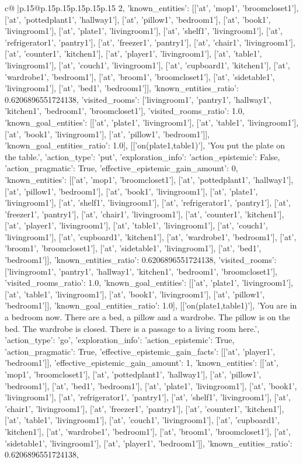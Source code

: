 \documentclass{article}
\begin{document}
{\begin{supertabular}{c@{$\;$}|p{.15\linewidth}@{}p{.15\linewidth}p{.15\linewidth}p{.15\linewidth}p{.15\linewidth}p{.15\linewidth}}
{{{2, 'known_entities': [['at', 'mop1', 'broomcloset1'], ['at', 'pottedplant1', 'hallway1'], ['at', 'pillow1', 'bedroom1'], ['at', 'book1', 'livingroom1'], ['at', 'plate1', 'livingroom1'], ['at', 'shelf1', 'livingroom1'], ['at', 'refrigerator1', 'pantry1'], ['at', 'freezer1', 'pantry1'], ['at', 'chair1', 'livingroom1'], ['at', 'counter1', 'kitchen1'], ['at', 'player1', 'livingroom1'], ['at', 'table1', 'livingroom1'], ['at', 'couch1', 'livingroom1'], ['at', 'cupboard1', 'kitchen1'], ['at', 'wardrobe1', 'bedroom1'], ['at', 'broom1', 'broomcloset1'], ['at', 'sidetable1', 'livingroom1'], ['at', 'bed1', 'bedroom1']], 'known_entities_ratio': 0.6206896551724138, 'visited_rooms': ['livingroom1', 'pantry1', 'hallway1', 'kitchen1', 'bedroom1', 'broomcloset1'], 'visited_rooms_ratio': 1.0, 'known_goal_entities': [['at', 'plate1', 'livingroom1'], ['at', 'table1', 'livingroom1'], ['at', 'book1', 'livingroom1'], ['at', 'pillow1', 'bedroom1']], 'known_goal_entities_ratio': 1.0}}], [['on(plate1,table1)'], 'You put the plate on the table.', {'action_type': 'put', 'exploration_info': {'action_epistemic': False, 'action_pragmatic': True, 'effective_epistemic_gain_amount': 0, 'known_entities': [['at', 'mop1', 'broomcloset1'], ['at', 'pottedplant1', 'hallway1'], ['at', 'pillow1', 'bedroom1'], ['at', 'book1', 'livingroom1'], ['at', 'plate1', 'livingroom1'], ['at', 'shelf1', 'livingroom1'], ['at', 'refrigerator1', 'pantry1'], ['at', 'freezer1', 'pantry1'], ['at', 'chair1', 'livingroom1'], ['at', 'counter1', 'kitchen1'], ['at', 'player1', 'livingroom1'], ['at', 'table1', 'livingroom1'], ['at', 'couch1', 'livingroom1'], ['at', 'cupboard1', 'kitchen1'], ['at', 'wardrobe1', 'bedroom1'], ['at', 'broom1', 'broomcloset1'], ['at', 'sidetable1', 'livingroom1'], ['at', 'bed1', 'bedroom1']], 'known_entities_ratio': 0.6206896551724138, 'visited_rooms': ['livingroom1', 'pantry1', 'hallway1', 'kitchen1', 'bedroom1', 'broomcloset1'], 'visited_rooms_ratio': 1.0, 'known_goal_entities': [['at', 'plate1', 'livingroom1'], ['at', 'table1', 'livingroom1'], ['at', 'book1', 'livingroom1'], ['at', 'pillow1', 'bedroom1']], 'known_goal_entities_ratio': 1.0}}], [['on(plate1,table1)'], 'You are in a bedroom now. There are a bed, a pillow and a wardrobe. The pillow is on the bed. The wardrobe is closed. There is a passage to a living room here.', {'action_type': 'go', 'exploration_info': {'action_epistemic': True, 'action_pragmatic': True, 'effective_epistemic_gain_facts': [['at', 'player1', 'bedroom1']], 'effective_epistemic_gain_amount': 1, 'known_entities': [['at', 'mop1', 'broomcloset1'], ['at', 'pottedplant1', 'hallway1'], ['at', 'pillow1', 'bedroom1'], ['at', 'bed1', 'bedroom1'], ['at', 'plate1', 'livingroom1'], ['at', 'book1', 'livingroom1'], ['at', 'refrigerator1', 'pantry1'], ['at', 'shelf1', 'livingroom1'], ['at', 'chair1', 'livingroom1'], ['at', 'freezer1', 'pantry1'], ['at', 'counter1', 'kitchen1'], ['at', 'table1', 'livingroom1'], ['at', 'couch1', 'livingroom1'], ['at', 'cupboard1', 'kitchen1'], ['at', 'wardrobe1', 'bedroom1'], ['at', 'broom1', 'broomcloset1'], ['at', 'sidetable1', 'livingroom1'], ['at', 'player1', 'bedroom1']], 'known_entities_ratio': 0.6206896551724138, }}}
\end{supertabular}}
\end{document}
